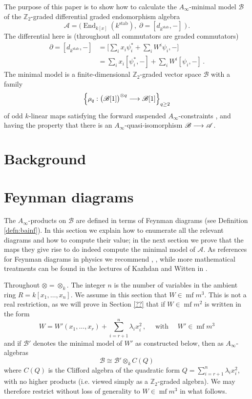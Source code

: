 \documentclass[english,letter paper,12pt,leqno]{article}
\theoremstyle{example}
\numberwithin{equation}{section}
\def\stab{\operatorname{stab}}
\def\be{\begin{equation}}
\def\ee{\end{equation}}
\def\nZ{\mathds{Z}}
\DeclareMathOperator{\End}{End}
\DeclareMathOperator{\mf}{mf}
\begin{document}
The purpose of this paper is to show how to calculate the $A_\infty$-minimal model $\mathscr{B}$ of the $\nZ_2$-graded differential graded endomorphism algebra
\be\label{eq:defnaw}
\mathscr{A} = \Big( \End_{k[x]}(k^{\operatorname{stab}}), \; \partial = [d_{k^{\stab}},-] \; \Big)\,.
\ee 
The differential here is (throughout all commutators are graded commutators)
\begin{align*}
\partial = [d_{k^{\stab}},-] &= \Big[\sum_i x_i \psi_i^* + \sum_i W^i \psi_i, -\Big]\\
&= \sum_i x_i [\psi_i^*,-] + \sum_i W^i [\psi_i,-]\,.
\end{align*}
The minimal model is a finite-dimensional $\nZ_2$-graded vector space $\mathscr{B}$ with a family 
\[
\left\{ \rho_q: \big(\mathscr{B}[1]\big)^{\otimes q} \longrightarrow \mathscr{B}[1] \right\}_{q \ge 2}
\]
of odd $k$-linear maps satisfying the forward suspended $A_\infty$-constraints \cite{lazaroiu}, and having the property that there is an $A_\infty$-quasi-isomorphism $\mathscr{B} \longrightarrow \mathscr{A}$.

\section{Background}

\section{Feynman diagrams}

The $A_\infty$-products on $\mathscr{B}$ are defined in terms of Feynman diagrams (see Definition \ref{defn:bainf}). In this section we explain how to enumerate all the relevant diagrams and how to compute their value; in the next section we prove that the maps they give rise to do indeed compute the minimal model of $\mathscr{A}$. As references for Feynman diagrams in physics we recommend \cite[Ch. 6]{weinberg}, \cite[\S 4.4]{ps}, while more mathematical treatments can be found in the lectures of Kazhdan and Witten in \cite{qftstring}.

Throughout $\otimes = \otimes_k$. The integer $n$ is the number of variables in the ambient ring $R = k[x_1,\ldots,x_n]$. We assume in this section that $W \in \mf{m}^3$. This is not a real restriction, as we will prove in Section \ref{??} that if $W \in \mf{m}^2$ is written in the form
\be
W = W'(x_1,\ldots,x_r) + \sum_{i={r+1}}^n \lambda_i x_i^2\,, \quad \text{ with } \quad W' \in \mf{m}^3
\ee
and if $\mathscr{B}'$ denotes the minimal model of $W'$ as constructed below, then as $A_\infty$-algebras
\be
\mathscr{B} \cong \mathscr{B}' \otimes_k C( Q )
\ee
where $C(Q)$ is the Clifford algebra of the quadratic form $Q = \sum_{i=r+1}^n \lambda_i x_i^2$, with no higher products (i.e. viewed simply as a $\nZ_2$-graded algebra). We may therefore restrict without loss of generality to $W \in \mf{m}^3$ in what follows.
\end{document}
